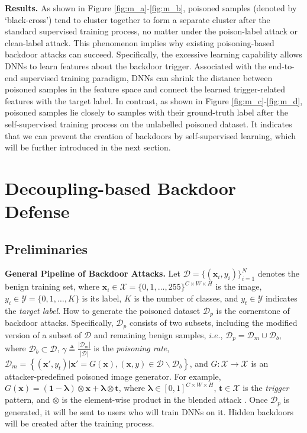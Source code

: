\noindent \textbf{Results.} 
As shown in Figure \ref{fig:m_a}-\ref{fig:m_b}, poisoned samples (denoted by `black-cross') tend to cluster together to form a separate cluster after the standard supervised training process, no matter under the poison-label attack or clean-label attack. This phenomenon implies why existing poisoning-based backdoor attacks can succeed. Specifically, the excessive learning capability allows DNNs to learn features about the backdoor trigger. Associated with the end-to-end supervised training paradigm, DNNs can shrink the distance between poisoned samples in the feature space and connect the learned trigger-related features with the target label. In contrast, as shown in Figure \ref{fig:m_c}-\ref{fig:m_d}, poisoned samples lie closely to samples with their ground-truth label after the self-supervised training process on the unlabelled poisoned dataset. %
It indicates that we can prevent the creation of backdoors by self-supervised learning, which will be further introduced in the next section. 

\section{Decoupling-based Backdoor Defense}

\subsection{Preliminaries}
\noindent \textbf{General Pipeline of Backdoor Attacks.} 
Let $\mathcal{D} = \{ (\bm{x}_i, y_i) \}_{i=1}^{N}$ denotes the benign training set, where $\bm{x}_i \in \mathcal{X}= \{0,1,\ldots, 255\}^{C\times W \times H}$ is the image, $y_i \in \mathcal{Y} = \{0,1,\ldots, K\}$ is its label, $K$ is the number of classes, and $y_t \in \mathcal{Y}$ indicates the \emph{target label}. How to generate the poisoned dataset $\mathcal{D}_{p}$ is the cornerstone of backdoor attacks. Specifically, $\mathcal{D}_{p}$ consists of two subsets, including the modified version of a subset of $\mathcal{D}$ and remaining benign samples, $i.e.$, 
$\mathcal{D}_{p} =  \mathcal{D}_{m} \cup \mathcal{D}_{b}$, where $\mathcal{D}_{b} \subset \mathcal{D}$, $\gamma \triangleq \frac{|\mathcal{D}_{m}|}{|\mathcal{D}|}$ is the \emph{poisoning rate}, 
$\mathcal{D}_{m} = \left\{(\bm{x}', y_t)| \bm{x}' = G(\bm{x}), (\bm{x},y) \in \mathcal{D} \backslash \mathcal{D}_{b} \right\}$, and $G: \mathcal{X} \rightarrow \mathcal{X}$ is an attacker-predefined poisoned image generator. For example, $G(\bm{x}) = (\bm{1}-\bm{\lambda}) \otimes \bm{x}+ \bm{\lambda} \otimes \bm{t}$, where $\bm{\lambda} \in [0,1]^{C \times W \times H}$, $\bm{t} \in \mathcal{X}$ is the \emph{trigger} pattern, and $\otimes$ is the element-wise product in the blended attack \citep{chen2017targeted}. Once $\mathcal{D}_{p}$ is generated, it will be sent to users who will train DNNs on it. Hidden backdoors will be created after the training process.

